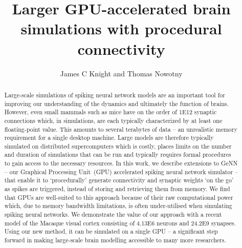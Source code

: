 \documentclass[9pt,a4paper]{amsart}
\title{Larger GPU-accelerated brain simulations with procedural connectivity}
\author{James C Knight and Thomas Nowotny}
\begin{document}
\begin{abstract}
Large-scale simulations of spiking neural network models are an important tool for improving our understanding of the dynamics and ultimately the function of brains.
However, even small mammals such as mice have on the order of \num{1E12} synaptic connections which, in simulations, are each typically characterized by at least one floating-point value.
This amounts to several terabytes of data -- an unrealistic memory requirement for a single desktop machine.
Large models are therefore typically simulated on distributed supercomputers which is costly, places limits on the number and duration of simulations that can be run and typically requires formal procedures to gain access to the necessary resources.
In this work, we describe extensions to GeNN -- our Graphical Processing Unit~(GPU) accelerated spiking neural network simulator -- that enable it to `procedurally' generate connectivity and synaptic weights `on the go' as spikes are triggered, instead of storing and retrieving them from memory.
We find that GPUs are well-suited to this approach because of their raw computational power which, due to memory bandwidth limitations, is often under-utilised when simulating spiking neural networks.
We demonstrate the value of our approach with a recent model of the Macaque visual cortex consisting of \num{4.13E6} neurons and \num{24.2E9} synapses.
Using our new method, it can be simulated on a single GPU -- a significant step forward in making large-scale brain modelling accessible to many more researchers.
\end{abstract}
\maketitle
\end{document}
